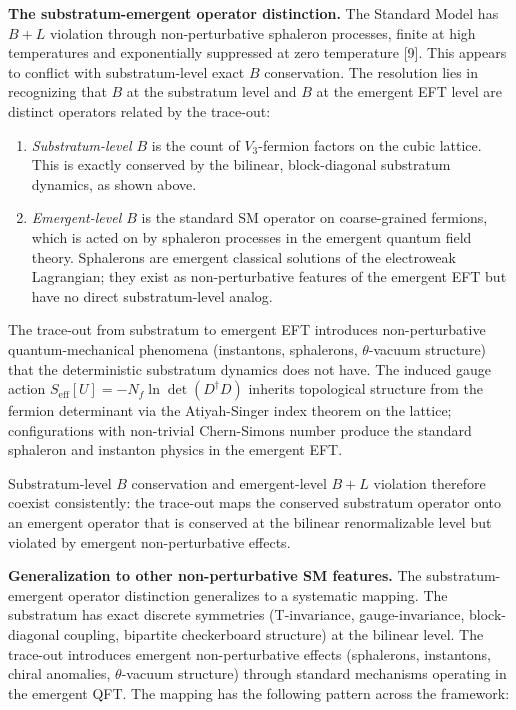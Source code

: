 \documentclass[
]{article}
\begin{document}
\textbf{The substratum-emergent operator distinction.} The Standard
Model has \(B + L\) violation through non-perturbative sphaleron
processes, finite at high temperatures and exponentially suppressed at
zero temperature {[}9{]}. This appears to conflict with substratum-level
exact \(B\) conservation. The resolution lies in recognizing that \(B\)
at the substratum level and \(B\) at the emergent EFT level are distinct
operators related by the trace-out:

\begin{enumerate}
\def\labelenumi{(\alph{enumi})}
\item
  \emph{Substratum-level \(B\)} is the count of \(V_3\)-fermion factors
  on the cubic lattice. This is exactly conserved by the bilinear,
  block-diagonal substratum dynamics, as shown above.
\item
  \emph{Emergent-level \(B\)} is the standard SM operator on
  coarse-grained fermions, which is acted on by sphaleron processes in
  the emergent quantum field theory. Sphalerons are emergent classical
  solutions of the electroweak Lagrangian; they exist as
  non-perturbative features of the emergent EFT but have no direct
  substratum-level analog.
\end{enumerate}

The trace-out from substratum to emergent EFT introduces
non-perturbative quantum-mechanical phenomena (instantons, sphalerons,
\(\theta\)-vacuum structure) that the deterministic substratum dynamics
does not have. The induced gauge action
\(S_{\mathrm{eff}}[U] = -N_f \ln \det(D^\dagger D)\) inherits
topological structure from the fermion determinant via the Atiyah-Singer
index theorem on the lattice; configurations with non-trivial
Chern-Simons number produce the standard sphaleron and instanton physics
in the emergent EFT.

Substratum-level \(B\) conservation and emergent-level \(B + L\)
violation therefore coexist consistently: the trace-out maps the
conserved substratum operator onto an emergent operator that is
conserved at the bilinear renormalizable level but violated by emergent
non-perturbative effects.

\textbf{Generalization to other non-perturbative SM features.} The
substratum-emergent operator distinction generalizes to a systematic
mapping. The substratum has exact discrete symmetries (T-invariance,
gauge-invariance, block-diagonal coupling, bipartite checkerboard
structure) at the bilinear level. The trace-out introduces emergent
non-perturbative effects (sphalerons, instantons, chiral anomalies,
\(\theta\)-vacuum structure) through standard mechanisms operating in
the emergent QFT. The mapping has the following pattern across the
framework:
\end{document}
